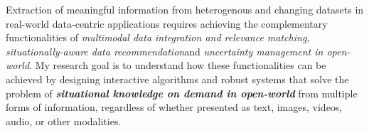 

Extraction of meaningful information from heterogenous and changing datasets in real-world data-centric applications requires achieving the complementary functionalities of \textit{ multimodal data integration and relevance matching, situationally-aware data recommendation}and \textit{uncertainty management in open-world}. My research goal is to understand how these functionalities can be achieved by designing interactive algorithms and robust systems that solve the problem of \textit{\textbf{situational knowledge on demand in open-world}} from multiple forms of information, regardless of whether presented as text, images, videos, audio, or other modalities.
